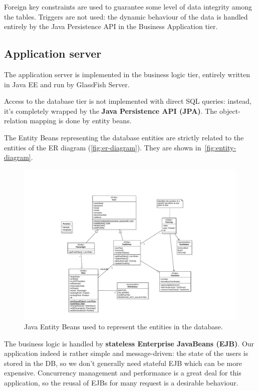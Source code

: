 Foreign key constraints are used to guarantee some level of data integrity among the tables.
Triggers are not used: the dynamic behaviour of the data is handled entirely by the Java Persistence API in the Business Application tier.

\subsection{Application server}
The application server is implemented in the business logic tier, entirely written in Java EE and run by GlassFish Server.

Access to the database tier is not implemented with direct SQL queries: instead, it's completely wrapped by the \textbf{Java Persistence API (JPA)}. The object-relation mapping is done by entity beans.

The Entity Beans representing the database entities are strictly related to the entities of the ER diagram (\autoref{fig:er-diagram}). They are shown in~\autoref{fig:entity-diagram}.

\begin{figure}
    \centering
    \includegraphics[width=\textwidth]{diagrams/entity_diagram}
    \caption{Java Entity Beans used to represent the entities in the database.}
    \label{fig:entity-diagram}
\end{figure}

The business logic is handled by \textbf{stateless Enterprise JavaBeans (EJB)}.
Our application indeed is rather simple and message-driven: the state of the users is stored in the DB, so we don't generally need stateful EJB which can be more expensive.
Concurrency management and performance is a great deal for this application, so the reusal of EJBs for many request is a desirable behaviour.


